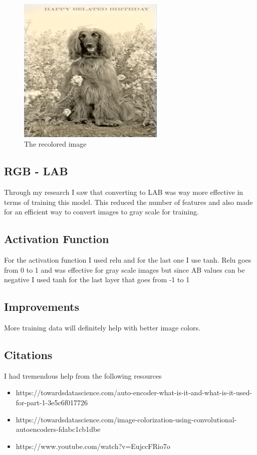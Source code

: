 \documentclass[12pt]{article} %
\begin{document}
\begin{figure}[H]
\centering
\includegraphics[width=70mm]{../result.png}
\caption{The recolored image \label{overflow}}
\end{figure}

\subsection{RGB - LAB}
Through my research I saw that converting to LAB was way more effective in terms of training this model. This reduced the number of features and also made for an efficient way to convert images to gray scale for training. 

\subsection{Activation Function}
For the activation function I used relu and for the last one I use tanh. Relu goes from 0 to 1 and was effective for gray scale images but since AB values can be negative I used tanh for the last layer that goes from -1 to 1

\subsection{Improvements}
More training data will definitely help with better image colors. 

\subsection{Citations}
I had tremendous help from the following resources \\

\begin{itemize}
\item https://towardsdatascience.com/auto-encoder-what-is-it-and-what-is-it-used-for-part-1-3e5c6f017726
\item https://towardsdatascience.com/image-colorization-using-convolutional-autoencoders-fdabc1cb1dbe
\item https://www.youtube.com/watch?v=EujccFRio7o
\end{itemize}
\end{document}
